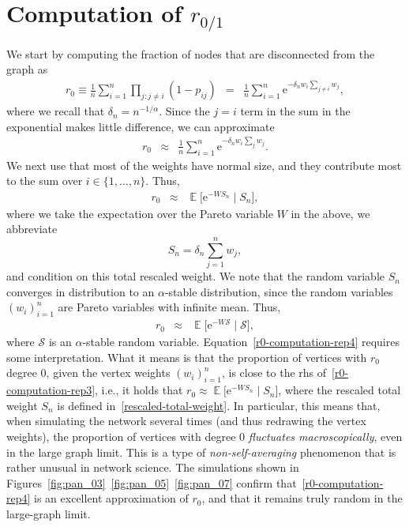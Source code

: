 \documentclass[ twocolumn,
 amsmath,amssymb,
 aps, pre, amsthm, amsfonts,
]{revtex4-2}
\DeclareMathOperator{\EX}{\mathbb{E}}%
\newcommand{\e}{\mathrm{e}}
\begin{document}
\section{Computation of $r_{0/1}$}
\label{app:rzerouno}
We start by computing the fraction of nodes that are disconnected from the graph as
\begin{eqnarray}
    r_{0} \equiv \frac{1}{n}\sum_{i=1}^n \prod_{j\colon j\neq i} (1-p_{ij})
    &=& \frac{1}{n}\sum_{i=1}^n\e^{-\delta_n w_i \sum_{j\neq i}w_j}\label{r0-computation-rep},
\end{eqnarray}
where we recall that  $\delta_n=n^{-1/\alpha}$. Since the $j=i$ term in the sum in the exponential makes little difference, we can approximate
\begin{eqnarray}
    r_{0}
    &\approx& \frac{1}{n}\sum_{i=1}^n\e^{-\delta_n w_i \sum_{j}w_j}\label{r0-computation-rep2}.
\end{eqnarray}
We next use that most of the weights have normal size, and they contribute most to the sum over $i\in\{1, \ldots, n\}$. Thus, 
\begin{eqnarray}
    r_{0}
    &\approx& \EX\Big[\e^{- W S_n}\mid S_n\Big]\label{r0-computation-rep3},
\end{eqnarray}
where we take the expectation over the Pareto variable $W$ in the above, we abbreviate
    \begin{equation}
    \label{rescaled-total-weight}
        S_n=\delta_n\sum_{j=1}^nw_j,
    \end{equation}
and condition on this total rescaled weight. We note that the random variable $S_n$ converges in distribution to an $\alpha$-stable distribution, since the random variables $(w_i)_{i=1}^n$ are Pareto variables with infinite mean. Thus,
\begin{eqnarray}
    r_{0}
    &\approx& \EX\Big[\e^{- W \mathcal{S}}\mid \mathcal{S}\Big]\label{r0-computation-rep4},
\end{eqnarray}
where $\mathcal{S}$ is an $\alpha$-stable random variable. 
Equation~\eqref{r0-computation-rep4} requires some interpretation. What it means is that the proportion of vertices with $r_0$ degree 0, given the vertex weights $(w_i)_{i=1}^n$, is close to the rhs of~\eqref{r0-computation-rep3}, i.e., it holds that
$r_0\approx \EX\Big[\e^{- W S_n}\mid S_n\Big]$, where the rescaled total weight $S_n$ is defined in~\eqref{rescaled-total-weight}.
In particular, this means that, when simulating the network several times (and thus redrawing the vertex weights), the proportion of vertices with degree 0 {\em fluctuates macroscopically}, even in the large graph limit. This is a type of {\em non-self-averaging} phenomenon that is rather unusual in network science. The simulations shown in Figures~\ref{fig:pan_03}~\ref{fig:pan_05}~\ref{fig:pan_07} confirm that~\eqref{r0-computation-rep4} is an excellent approximation of $r_0$, and that it remains truly random in the large-graph limit.
\end{document}
